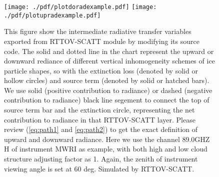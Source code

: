 \documentclass[a4paper]{report}
\begin{document}
\begin{figure}[hb] \label{fig:plotradexample}
\centering
\texttt{[image: ./pdf/plotdoradexample.pdf]}
\texttt{[image: ./pdf/plotupradexample.pdf]}
\caption{This figure show the intermediate radiative transfer variables exported from RTTOV-SCATT module by modifying its
source code. The solid and dotted line in the chart represent the upward or downward rediance 
of different vertical inhomogeneity schemes of ice particle shapes, so with the extinction loss (denoted by solid or hollow circles)
and source term (denoted by solid or hatched bars).
We use solid (positive contribution to radiance) or dashed (negative contribution to radiance) black line segement 
to connect the top of source term bar and the extinction circle, representing the net contribution to radiance in that
RTTOV-SCATT layer. 
Please review (\ref{eq:path1} and \ref{eq:path2}) to get the exact definition of upward and downward radiance. 
Here we use the channel 89.0GHZ H of instrument MWRI as example, with both high and low cloud structure
adjusting factor as 1. Again, the zenith of instrument viewing angle is set at 60 deg. 
Simulated by RTTOV-SCATT.}
\end{figure}
\end{document}
